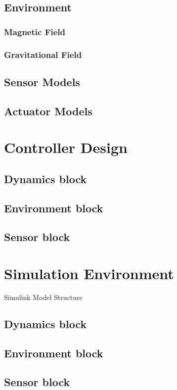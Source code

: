 \subsection{Environment}
\subsubsection{Magnetic Field}
\subsubsection{Gravitational Field}

\subsection{Sensor Models}

\subsection{Actuator Models}

\section{Controller Design}
\subsection{Dynamics block}
\subsection{Environment block}
\subsection{Sensor block}

\section{Simulation Environment}
Simulink Model Structure

\subsection{Dynamics block}
\subsection{Environment block}
\subsection{Sensor block}
